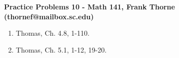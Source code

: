 \documentclass[12pt]{article}
\begin{document}
\setlength{\topmargin}{-2mm}





\begin{center}{\bf Practice Problems 10 - Math 141, Frank Thorne (thornef@mailbox.sc.edu)}

\medskip

\medskip

\end{center}
\vskip -0.1in

\begin{enumerate}
\item
Thomas, Ch. 4.8, 1-110.

\item
Thomas, Ch. 5.1, 1-12, 19-20.

\end{enumerate}
\end{document}
